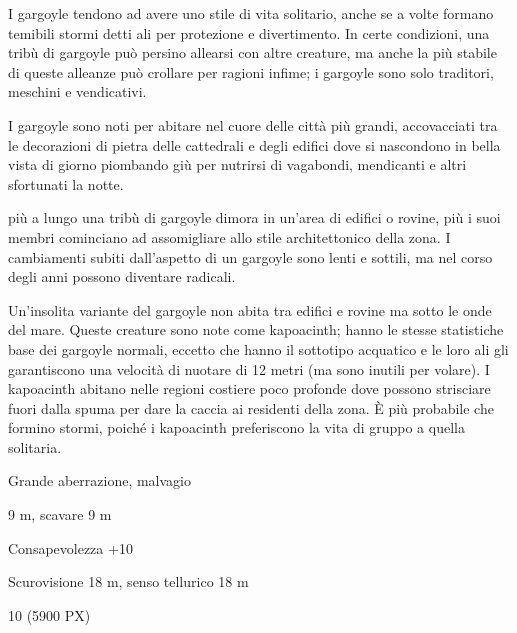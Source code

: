 \begin{multicols}{2}
{I gargoyle tendono ad avere uno stile di vita solitario, anche se a volte formano temibili stormi detti ali per protezione e divertimento. In certe condizioni, una tribù di gargoyle può persino allearsi con altre creature, ma anche la più stabile di queste alleanze può crollare per ragioni infime; i gargoyle sono solo traditori, meschini e vendicativi.

I gargoyle sono noti per abitare nel cuore delle città più grandi, accovacciati tra le decorazioni di pietra delle cattedrali e degli edifici dove si nascondono in bella vista di giorno piombando giù per nutrirsi di vagabondi, mendicanti e altri sfortunati la notte.

più a lungo una tribù di gargoyle dimora in un'area di edifici o rovine, più i suoi membri cominciano ad assomigliare allo stile architettonico della zona. I cambiamenti subiti dall'aspetto di un gargoyle sono lenti e sottili, ma nel corso degli anni possono diventare radicali.

Un'insolita variante del gargoyle non abita tra edifici e rovine ma sotto le onde del mare. Queste creature sono note come kapoacinth; hanno le stesse statistiche base dei gargoyle normali, eccetto che hanno il sottotipo acquatico e le loro ali gli garantiscono una velocità di nuotare di 12 metri (ma sono inutili per volare). I kapoacinth abitano nelle regioni costiere poco profonde dove possono strisciare fuori dalla spuma per dare la caccia ai residenti della zona. È più probabile che formino stormi, poiché i kapoacinth preferiscono la vita di gruppo a quella solitaria.

\begin{description}[noitemsep, topsep=0pt, parsep=0pt, partopsep=0pt, itemsep=1pt, leftmargin=2.35cm,  labelwidth=2.2cm, itemindent=0cm, listparindent=0pt] %
\setlength{\baselineskip}{10pt}
\item[\textbf{Taglia/Tipo}] Grande aberrazione, malvagio
\item[\textbf{Caratt.}] 
\item[\textbf{Punti Ferita}] 
\item[\textbf{Movimento}] 9 m, scavare 9 m
\item[\textbf{Tiri Salvez.}] 
\item[\textbf{Comp.}] Consapevolezza +10
\item[\textbf{Sensi}] Scurovisione 18 m, senso tellurico 18 m
\item[\textbf{Sfida}] 10 (5900 PX)
\end{description}
\smallskip

}
\end{multicols}
